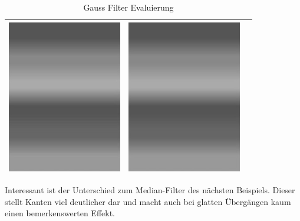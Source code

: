 \documentclass[12pt,german]{article}
\begin{document}
\begin{table}[H]
\begin{tabular}{| c | c | c |}
	\includegraphics[width=5cm]{../testData/Gauss/Regenbogen.jpg} & 	\includegraphics[width=5cm]{../testData/Gauss/RegenbogenR4S2.jpg} \\
	\hline
  \end{tabular}
  \caption{Gauss Filter Evaluierung}
  \label{tab:GaussFilterEvaluierung}
\end{table}
Interessant ist der Unterschied zum Median-Filter des nächsten Beispiels. Dieser stellt Kanten viel deutlicher dar und macht auch bei glatten Übergängen kaum einen bemerkenswerten Effekt.
\end{document}
